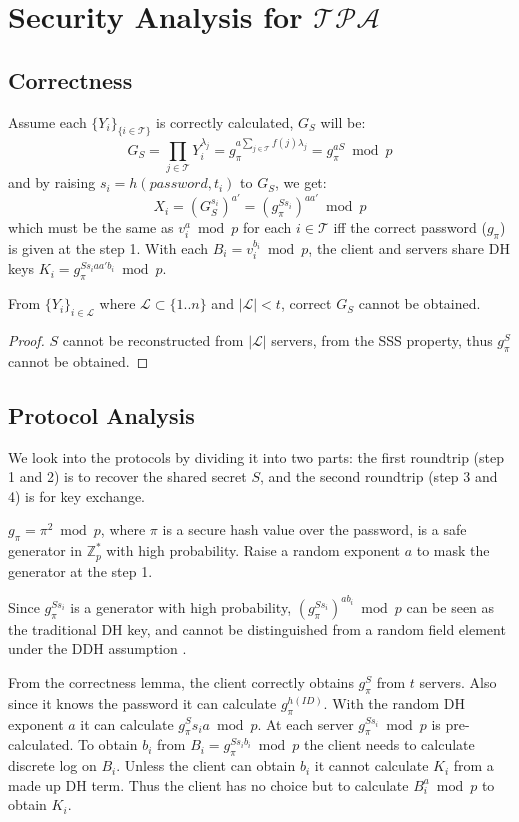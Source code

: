 \section{Security Analysis for $\mathcal{TPA}$}
\label{tpa}
\subsection{Correctness}
Assume each $\{Y_i\}_{\{i \in \mathcal{T}\}}$ is correctly calculated,
$G_S$ will be:
\[
  G_S = \prod_{j \in \mathcal{T}}Y_i^{\lambda_j} = g_{\pi}^{a \sum_{j
      \in \mathcal{T}} f(j) \lambda_j} = g_{\pi}^{aS} \bmod p
\]
and by raising $s_i = h(password, t_i)$ to $G_S$, we get:
\[
  X_i = (G_S^{s_i})^{a'} = (g_{\pi}^{Ss_i})^{aa'} \bmod p
\]
which must be the same as $v_i^{a} \bmod p$ for each $i \in
\mathcal{T}$ iff the correct password ($g_{\pi}$) is given at the
step 1. With each $B_i = v_i^{b_i} \bmod p$, the client and servers
share DH keys $K_i = g_{\pi}^{Ss_iaa'b_i} \bmod p$.

\begin{lemma}
\label{tpa1}
From $\{Y_i\}_{i \in \mathcal{L}}$ where $\mathcal{L} \subset \{1..n\}$ and $|\mathcal{L}| <
t$, correct $G_S$ cannot be obtained.
\end{lemma}

\begin{proof}
$S$ cannot be reconstructed from $|\mathcal{L}|$ servers, from the SSS
  property, thus $g_{\pi}^S$ cannot be obtained.
\end{proof}

\subsection{Protocol Analysis}
We look into the protocols by dividing it into two parts: the first
roundtrip (step 1 and 2) is to recover the shared secret $S$, and
the second roundtrip (step 3 and 4) is for key exchange.

$g_{\pi} = \pi^2 \bmod p$, where $\pi$ is a secure hash value over the
password, is a safe generator in $\mathbb{Z}^*_p$ with high
probability. Raise a random exponent $a$ to mask the generator at the
step 1. 

Since $g_{\pi}^{Ss_i}$ is a generator with high probability,
$(g_{\pi}^{Ss_i})^{ab_i} \bmod p$ can be seen as the traditional DH
key, and cannot be distinguished from a random field element under the
DDH assumption \cite{boneh}.

From the correctness lemma, the client correctly obtains
$g_{\pi}^S$ from $t$ servers. Also since it knows the password it can
calculate $g_{\pi}^{h(ID)}$. With the random DH exponent $a$ it can
calculate $g_{\pi}^Ss_ia \bmod p$. At each server $g_{\pi}^{Ss_i}
\bmod p$ is pre-calculated. To obtain $b_i$ from $B_i =
g_{\pi}^{Ss_ib_i} \bmod p$ the client needs to calculate discrete log
on $B_i$. Unless the client can obtain $b_i$ it cannot calculate $K_i$
from a made up DH term. Thus the client has no choice but to calculate
$B_i^a \bmod p$ to obtain $K_i$.

